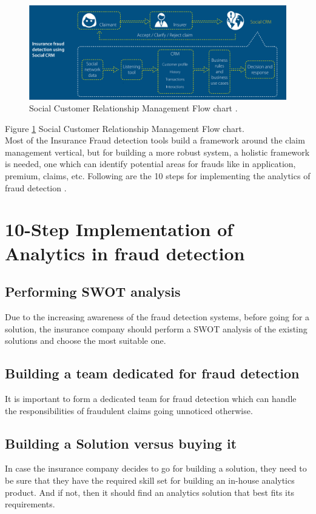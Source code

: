 \documentclass[sigconf]{acmart}
\begin{document}
\begin{figure}
  \includegraphics[width=\linewidth]{images/SCRM_image1.png}
  \caption{Social Customer Relationship Management Flow chart \cite{link7}.}
  \label{F: Social Customer Relationship Management Flow chart}
\end{figure}
Figure \ref{F: Social Customer Relationship Management Flow chart} Social Customer Relationship Management Flow chart.\\

Most of the Insurance Fraud detection tools build a framework around the claim management vertical, but for building a more robust system, a holistic framework is needed, one which can identify potential areas for frauds like in application, premium, claims, etc. Following are the 10 steps for implementing the analytics of fraud detection \cite{link7}.

\section{10-Step Implementation of Analytics in fraud detection}
\subsection{Performing SWOT analysis}
Due to the increasing awareness of the fraud detection systems, before going for a solution, the insurance company should perform a SWOT analysis of the existing solutions and choose the most suitable one.
\subsection{Building a team dedicated for fraud detection}
It is important to form a dedicated team for fraud detection which can handle the responsibilities of fraudulent claims going unnoticed otherwise.
\subsection{Building a Solution versus buying it}
In case the insurance company decides to go for building a solution, they need to be sure that they have the required skill set for building an in-house analytics product. And if not, then it should find an analytics solution that best fits its requirements. 
\end{document}
